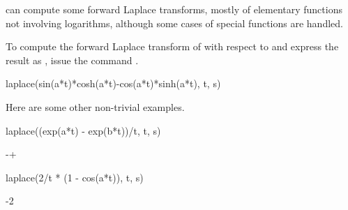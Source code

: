 {{{{{{{{{{{{{%
%
\Language{} can compute some forward Laplace transforms, mostly
of elementary
functions
not involving logarithms, although some cases of
special functions are handled.
\begin{xtc}
\begin{xtccomment}
To compute the forward Laplace transform of  with respect to
 and express the result as , issue the command
.
\end{xtccomment}
\begin{spadsrc}
laplace(sin(a*t)*cosh(a*t)-cos(a*t)*sinh(a*t), t, s)
\end{spadsrc}
\begin{TeXOutput}
\begin{fricasmath}{1}
%
\end{fricasmath}
\end{TeXOutput}
\end{xtc}
\begin{xtc}
\begin{xtccomment}
Here are some other non-trivial examples.
\end{xtccomment}
\begin{spadsrc}
laplace((exp(a*t) - exp(b*t))/t, t, s)
\end{spadsrc}
\begin{TeXOutput}
\begin{fricasmath}{2}
-{}+%
\end{fricasmath}
\end{TeXOutput}
\end{xtc}
\begin{xtc}
\begin{xtccomment}
\end{xtccomment}
\begin{spadsrc}
laplace(2/t * (1 - cos(a*t)), t, s)
\end{spadsrc}
\begin{TeXOutput}
\begin{fricasmath}{3}
-{2\TIMES \log{%
}}
\end{fricasmath}
\end{TeXOutput}
\end{xtc}}}}}}}}}}}}}}

